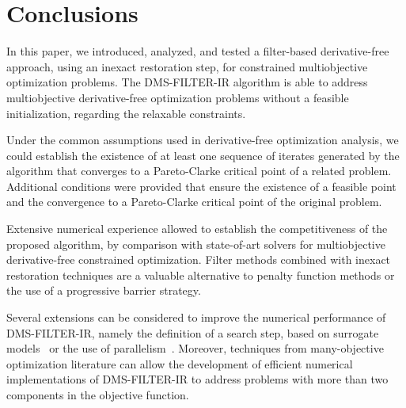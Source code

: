 \documentclass[12pt]{article}
\begin{document}
\section{Conclusions}
\label{sec:conclusions} In this paper, we introduced, analyzed,
and tested a filter-based derivative-free approach, using an
inexact restoration step, for constrained multiobjective
optimization problems. The DMS-FILTER-IR algorithm is able to
address multiobjective derivative-free optimization problems
without a feasible initialization, regarding the relaxable
constraints.

Under the common assumptions used in derivative-free optimization
analysis, we could establish the existence of at least one
sequence of iterates generated by the algorithm that converges to
a Pareto-Clarke critical point of a related problem. Additional
conditions were provided that ensure the existence of a feasible
point and the convergence to a Pareto-Clarke critical point of the
original problem.

Extensive numerical experience allowed to establish the
competitiveness of the proposed algorithm, by comparison with
state-of-art solvers for multiobjective derivative-free
constrained optimization. Filter methods combined with inexact
restoration techniques are a valuable alternative to penalty
function methods or the use of a progressive barrier strategy.

Several extensions can be considered to improve the numerical
performance of DMS-FILTER-IR, namely the definition of a search
step, based on surrogate models~\cite{bras2020} or the use of
parallelism~\cite{tavares2022}. Moreover, techniques from
many-objective optimization literature can allow the development
of efficient numerical implementations of DMS-FILTER-IR to address
problems with more than two components in the objective function.




\end{document}
